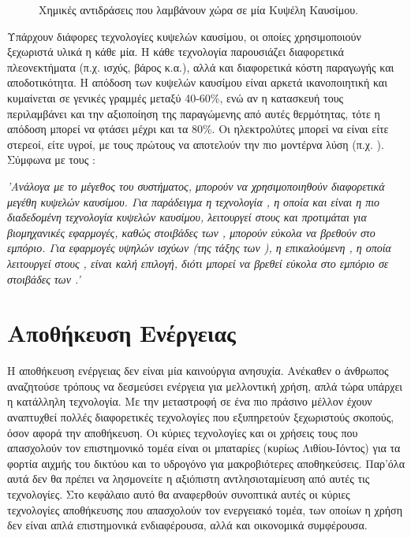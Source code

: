 \documentclass[12pt]{report}
\begin{document}
\begin{figure}[h]
				\center
				{}
				\captionsetup{width=0.8\textwidth}
				\caption{Χημικές αντιδράσεις που λαμβάνουν χώρα σε μία Κυψέλη Καυσίμου.}
				\label{eq:fuelcell}
\end{figure}

Υπάρχουν διάφορες τεχνολογίες κυψελών καυσίμου, οι οποίες χρησιμοποιούν ξεχωριστά υλικά η κάθε μία. Η κάθε τεχνολογία παρουσιάζει διαφορετικά πλεονεκτήματα (π.χ. ισχύς, βάρος κ.α.), αλλά και διαφορετικά κόστη παραγωγής 
και αποδοτικότητα. Η απόδοση των κυψελών καυσίμου είναι αρκετά ικανοποιητική και κυμαίνεται σε γενικές γραμμές μεταξύ 40-60\%, ενώ αν η κατασκευή τους περιλαμβάνει και την αξιοποίηση της παραγώμενης από αυτές θερμότητας, τότε η 
απόδοση μπορεί να φτάσει μέχρι και τα 80\%. Οι ηλεκτρολύτες μπορεί να είναι είτε στερεοί, είτε υγροί, με τους πρώτους να αποτελούν την πιο μοντέρνα λύση (π.χ. {}). Σύμφωνα με
τους \textcite{diaz2016}:

{\textit{'Ανάλογα με το μέγεθος του συστήματος, μπορούν να χρησιμοποιηθούν διαφορετικά μεγέθη κυψελών καυσίμου. Για παράδειγμα η τεχνολογία {}, η οποία και είναι η πιο διαδεδομένη τεχνολογία κυψελών καυσίμου,
λειτουργεί στους {} και προτιμάται για βιομηχανικές εφαρμογές, καθώς στοιβάδες των {}, μπορούν εύκολα να βρεθούν στο εμπόριο. Για εφαρμογές υψηλών ισχύων (της τάξης των {}),
η επικαλούμενη {}, η οποία λειτουργεί στους {}, είναι καλή επιλογή, διότι μπορεί να βρεθεί εύκολα στο εμπόριο σε στοιβάδες των {}.'}}

\chapter{Αποθήκευση Ενέργειας}
\label{chap:storage}
Η αποθήκευση ενέργειας δεν είναι μία καινούργια ανησυχία. Ανέκαθεν ο άνθρωπος αναζητούσε τρόπους να δεσμεύσει ενέργεια για μελλοντική χρήση, απλά τώρα υπάρχει η κατάλληλη τεχνολογία. 
Με την μεταστροφή σε ένα πιο πράσινο μέλλον έχουν αναπτυχθεί πολλές διαφορετικές τεχνολογίες που εξυπηρετούν ξεχωριστούς σκοπούς, όσον αφορά την αποθήκευση. Οι κύριες τεχνολογίες και οι χρήσεις τους που απασχολούν
τον επιστημονικό τομέα
είναι οι μπαταρίες (κυρίως Λιθίου-Ιόντος) για τα φορτία αιχμής του δικτύου και το υδρογόνο για μακροβιότερες αποθηκεύσεις. Παρ'όλα αυτά δεν θα πρέπει να λησμονείτε η αξιόπιστη αντλησιοταμίευση από αυτές τις τεχνολογίες. 
Στο κεφάλαιο αυτό θα αναφερθούν συνοπτικά αυτές οι κύριες τεχνολογίες αποθήκευσης που απασχολούν τον ενεργειακό τομέα, των οποίων η χρήση δεν είναι απλά επιστημονικά ενδιαφέρουσα, αλλά και οικονομικά συμφέρουσα.
\end{document}
